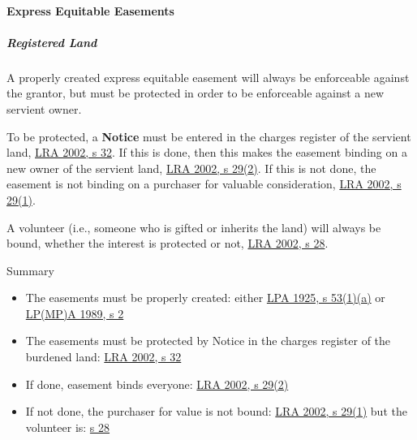 \documentclass[
]{article}
\providecommand{\tightlist}{%
  \setlength{\itemsep}{0pt}\setlength{\parskip}{0pt}}
\newenvironment{env-d6ce83a0-f7a8-46b6-be95-b1235f1feb63}
{
    \savenotes\tcolorbox[blanker,breakable,left=5pt,borderline west={2pt}{-4pt}{gray}]
}
{
    \endtcolorbox\spewnotes
}
\begin{document}
\hypertarget{express-equitable-easements}{%
\paragraph{Express Equitable
Easements}\label{express-equitable-easements}}

\hypertarget{registered-land-2}{%
\subparagraph{Registered Land}\label{registered-land-2}}

A properly created express equitable easement will always be enforceable
against the grantor, but must be protected in order to be enforceable
against a new servient owner.

To be protected, a \textbf{Notice} must be entered in the charges
register of the servient land,
\href{https://www.legislation.gov.uk/ukpga/2002/9/section/32}{LRA 2002,
s 32}. If this is done, then this makes the easement binding on a new
owner of the servient land,
\href{https://www.legislation.gov.uk/ukpga/2002/9/section/29}{LRA 2002,
s 29(2)}. If this is not done, the easement is not binding on a
purchaser for valuable consideration,
\href{https://www.legislation.gov.uk/ukpga/2002/9/section/29}{LRA 2002,
s 29(1)}.

A volunteer (i.e., someone who is gifted or inherits the land) will
always be bound, whether the interest is protected or not,
\href{https://www.legislation.gov.uk/ukpga/2002/9/section/28}{LRA 2002,
s 28}.

\begin{env-d6ce83a0-f7a8-46b6-be95-b1235f1feb63}

Summary

\begin{itemize}
\tightlist
\item
  The easements must be properly created: either
  \href{https://www.legislation.gov.uk/ukpga/Geo5/15-16/20/section/53}{LPA
  1925, s 53(1)(a)} or
  \href{https://www.legislation.gov.uk/ukpga/1989/34/section/2}{LP(MP)A
  1989, s 2}
\item
  The easements must be protected by Notice in the charges register of
  the burdened land:
  \href{https://www.legislation.gov.uk/ukpga/2002/9/section/32}{LRA
  2002, s 32}
\item
  If done, easement binds everyone:
  \href{https://www.legislation.gov.uk/ukpga/2002/9/section/29}{LRA
  2002, s 29(2)}
\item
  If not done, the purchaser for value is not bound:
  \href{https://www.legislation.gov.uk/ukpga/2002/9/section/29}{LRA
  2002, s 29(1)} but the volunteer is:
  \href{https://www.legislation.gov.uk/ukpga/2002/9/section/28}{s 28}
\end{itemize}

\end{env-d6ce83a0-f7a8-46b6-be95-b1235f1feb63}
\end{document}
